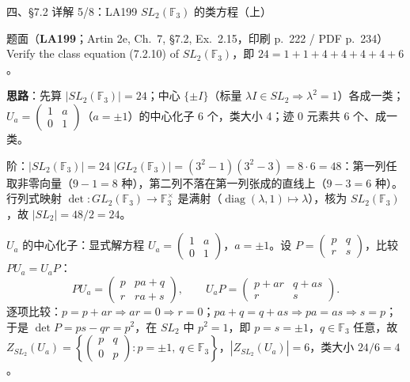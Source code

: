\documentclass[aspectratio=169,10pt,fontset=none]{ctexbeamer}
\newcommand{\ex}[1]{\textcolor{accent}{\footnotesize\bfseries #1}}
\newcommand{\key}[1]{\textcolor{ink}{\bfseries #1}}
\begin{document}
\begin{frame}[t]{四、\S7.2 详解 5/8：LA199 $SL_2(\mathbb F_3)$ 的类方程（上）}
\label{ex:LA199}
\scriptsize
\begin{block}{\footnotesize 题面（\ex{LA199}；Artin 2e, Ch.~7, \S7.2, Ex.~2.15，印刷 p.~222 / PDF p.~234）}
Verify the class equation (7.2.10) of $SL_2(\mathbb F_3)$，即 $24=1+1+4+4+4+4+6$。
\end{block}
\key{思路}：先算 $|SL_2(\mathbb F_3)|=24$；中心 $\{\pm I\}$（标量 $\lambda I\in SL_2\Rightarrow\lambda^2=1$）各成一类；$U_a=\begin{pmatrix}1&a\\0&1\end{pmatrix}$（$a=\pm1$）的中心化子 6 个，类大小 4；迹 0 元素共 6 个、成一类。
\begin{block}{\footnotesize 阶：$|SL_2(\mathbb F_3)|=24$}
$|GL_2(\mathbb F_3)|=(3^2-1)(3^2-3)=8\cdot6=48$：第一列任取非零向量（$9-1=8$ 种），第二列不落在第一列张成的直线上（$9-3=6$ 种）。行列式映射 $\det:GL_2(\mathbb F_3)\to\mathbb F_3^\times$ 是满射（$\operatorname{diag}(\lambda,1)\mapsto\lambda$），核为 $SL_2(\mathbb F_3)$，故 $|SL_2|=48/2=24$。
\end{block}
\begin{block}{\footnotesize $U_a$ 的中心化子：显式解方程}
$U_a=\begin{pmatrix}1&a\\0&1\end{pmatrix}$，$a=\pm1$。设 $P=\begin{pmatrix}p&q\\r&s\end{pmatrix}$，比较 $PU_a=U_aP$：
\[
PU_a=\begin{pmatrix}p&pa+q\\r&ra+s\end{pmatrix},\qquad
U_aP=\begin{pmatrix}p+ar&q+as\\r&s\end{pmatrix}.
\]
逐项比较：$p=p+ar\Rightarrow ar=0\Rightarrow r=0$；$pa+q=q+as\Rightarrow pa=as\Rightarrow s=p$；于是 $\det P=ps-qr=p^2$，在 $SL_2$ 中 $p^2=1$，即 $p=s=\pm1$，$q\in\mathbb F_3$ 任意，故 $Z_{SL_2}(U_a)=\left\{\begin{pmatrix}p&q\\0&p\end{pmatrix}:p=\pm1,\ q\in\mathbb F_3\right\}$，$|Z_{SL_2}(U_a)|=6$，类大小 $24/6=4$。
\end{block}
\end{frame}
\end{document}
